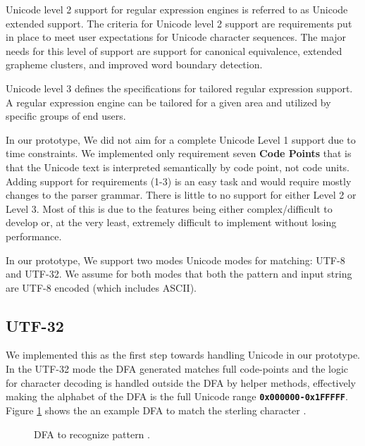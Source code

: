 Unicode level 2 support for regular expression engines is referred to as Unicode extended support. The criteria for Unicode level 2 support are requirements put in place to meet user expectations for Unicode character sequences. The major needs for this level of support are support for canonical equivalence, extended grapheme clusters, and improved word boundary detection.

Unicode level 3 defines the specifications for tailored regular expression support. A regular expression engine can be tailored for a given area and utilized by specific groups of end users.

In our prototype, We did not aim for a complete Unicode Level 1 support due to time constraints. We implemented only requirement seven \textbf{Code Points} that is that the Unicode text is interpreted semantically by code point, not code units. Adding support for requirements (1-3) is an easy task and would require mostly changes to the parser grammar. There is little to no support for either Level 2 or Level 3. Most of this is due to the features being either complex/difficult to develop or, at the very least, extremely difficult to implement without losing performance.

In our prototype, We support two modes Unicode modes for matching: UTF-8 and UTF-32. We assume for both modes that both the pattern and input string are UTF-8 encoded (which includes ASCII).

\subsection{UTF-32}
We implemented this as the first step towards handling Unicode in our prototype. 
In the UTF-32 mode the DFA generated matches full code-points and the logic for character decoding is handled outside the DFA by helper methods, effectively making the alphabet of the DFA is the full Unicode range \texttt{\textbf{0x000000-0x1FFFFF}}. Figure \ref{fig:utf32exdfa} shows the an example DFA to match the sterling character \texttt{\textsterling}.

\begin{figure}[H]
\centering
\usetikzlibrary{fit}
\caption{DFA to recognize pattern \texttt{\textsterling}.}
\label{fig:utf32exdfa}
\end{figure}

